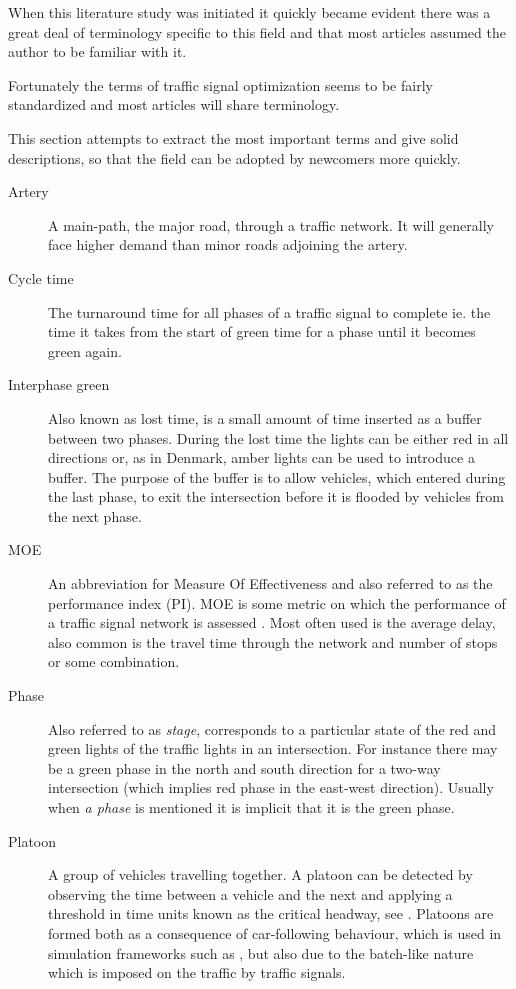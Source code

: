 \label{vocabulary}
When this literature study was initiated it quickly became evident there was a great deal of terminology specific to this field and that most articles assumed the author to be familiar with it. 

Fortunately the terms of traffic signal optimization seems to be fairly standardized and most articles will share terminology.

This section attempts to extract the most important terms and give solid descriptions, so that the field can be adopted by newcomers more quickly.

\begin{description}

\item[Artery] A main-path, the major road, through a traffic network. It will generally face higher demand than minor roads adjoining the artery.
			
	\item[Cycle time] The turnaround time for all phases of a traffic signal to complete ie. the time it takes from the start of green time for a phase until it becomes green again.

\item[Interphase green] Also known as lost time, is a small amount of time inserted as a buffer between two phases. During the lost time the lights can be either red in all directions or, as in Denmark, amber lights can be used to introduce a buffer. The purpose of the buffer is to allow vehicles, which entered during the last phase, to exit the intersection before it is flooded by vehicles from the next phase.

	\item[MOE] An abbreviation for Measure Of Effectiveness and also referred to as the performance index (PI). MOE is some metric on which the performance of a traffic signal network is assessed .
	Most often used is the average delay, also common is the travel time through the network and number of stops or some combination.
	
	\item[Phase] Also referred to as \textit{stage}, corresponds to a particular state of the red and green lights of the traffic lights in an intersection. 
	For instance there may be a green phase in the north and south direction for a two-way intersection (which implies red phase in the east-west direction). Usually when \textit{a phase} is mentioned it is implicit that it is the green phase.
	
	\item[Platoon] A group of vehicles travelling together. A platoon can be detected by observing the time between a vehicle and the next and applying a threshold in time units known as the critical headway, see \cite[sct. 2]{25}. 
Platoons are formed both as a consequence of car-following behaviour, which is used in simulation frameworks such as \cite{treiber-2000-62}, but also due to the batch-like nature which is imposed on the traffic by traffic signals.


\end{description}

